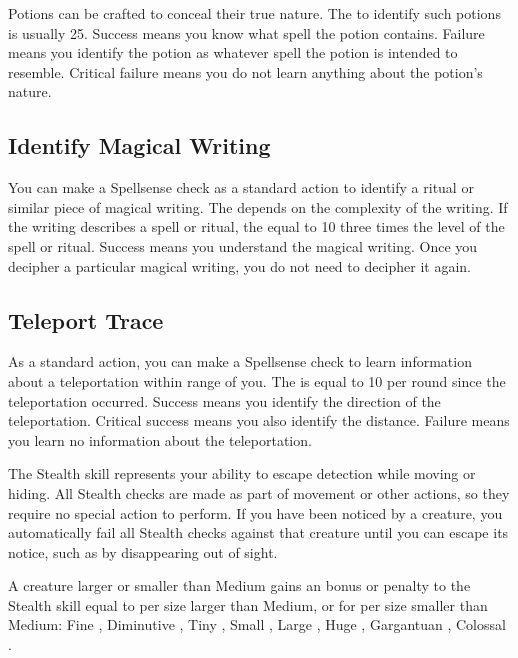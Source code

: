         Potions can be crafted to conceal their true nature.
        The  to identify such potions is usually 25.
        Success means you know what spell the potion contains.
        Failure means you identify the potion as whatever spell the potion is intended to resemble.
        Critical failure means you do not learn anything about the potion's nature.

    \subsection{Identify Magical Writing}\label{Identify Magical Writing}
        You can make a Spellsense check as a standard action to identify a ritual or similar piece of magical writing.
        The  depends on the complexity of the writing.
        If the writing describes a spell or ritual, the  equal to 10 \add three times the level of the spell or ritual.
        Success means you understand the magical writing.
        Once you decipher a particular magical writing, you do not need to decipher it again.

    \subsection{Teleport Trace}
        As a standard action, you can make a Spellsense check to learn information about a teleportation within \rngmed range of you.
        The  is equal to 10  per round since the teleportation occurred.
        Success means you identify the direction of the teleportation.
        Critical success means you also identify the distance.
        Failure means you learn no information about the teleportation.

\newpage
{}
        The Stealth skill represents your ability to escape detection while moving or hiding. All Stealth checks are made as part of movement or other actions, so they require no special action to perform. If you have been noticed by a creature, you automatically fail all Stealth checks against that creature until you can escape its notice, such as by disappearing out of sight.

        \label{Size and Stealth} A creature larger or smaller than Medium gains an bonus or penalty to the Stealth skill equal to  per size larger than Medium, or  for per size smaller than Medium: Fine , Diminutive , Tiny , Small , Large , Huge , Gargantuan , Colossal .

